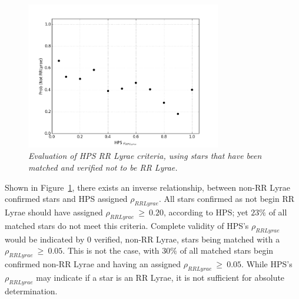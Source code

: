 \documentclass[aps,prb,twocolumn,superscriptaddress]{revtex4-1}
\begin{document}
\begin{figure}[H]
 \centering
 	\includegraphics[width=3.35in]{figures/NEW/probnotrr_vs_HPS.png}
 \caption{\it \small{Evaluation of HPS RR Lyrae criteria, using stars that have been matched and verified not to be RR Lyrae.}}
 \label{fig:probnotrrHPS}
\end{figure}



Shown in Figure~\ref{fig:probnotrrHPS}, there exists an inverse relationship, between non-RR Lyrae confirmed stars and HPS 
assigned $\rho_{RRLyrae}$.   
All stars confirmed as not begin RR Lyrae should have assigned $\rho_{RRLyrae}~\geq~0.20$, according to HPS; yet $23\%$ of 
all matched stars do not meet this criteria.  Complete validity of HPS's $\rho_{RRLyrae}$ would be indicated by 0 verified,
non-RR Lyrae, stars being matched with a $\rho_{RRLyrae}~\geq~0.05$.  This is not the case, with $30\%$ of all matched stars begin 
confirmed non-RR Lyrae and having an assigned $\rho_{RRLyrae}~\geq~0.05$.  While HPS's $\rho_{RRLyrae}$ may indicate if a star is 
an RR Lyrae, it is not sufficient for absolute determination.











\end{document}
